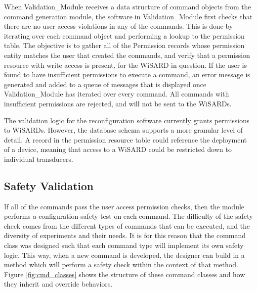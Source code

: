 When Validation\_Module receives a data structure of command objects from the command generation module, the software in Validation\_Module first checks that there are no user access violations in any of the commands. This is done by iterating over each command object and performing a lookup to the permission table. The objective is to gather all of the Permission records whose permission entity matches the user that created the commands, and verify that a permission resource with write access is present, for the WiSARD in question. If the user is found to have insufficient permissions to execute a command, an error message is generated and added to a queue of messages that is displayed once Validation\_Module has iterated over every command. All commands with insufficient permissions are rejected, and will not be sent to the WiSARDs.

The validation logic for the reconfiguration software currently grants permissions to WiSARDs. However, the database schema supports a more granular level of detail. A record in the permission resource table could reference the deployment of a device, meaning that access to a WiSARD could be restricted down to individual transducers. 

\subsection{Safety Validation}
 If all of the commands pass the user access permission checks, then the module performs a configuration safety test on each command. The difficulty of the safety check comes from the different types of commands that can be executed, and the diversity of experiments and their needs. It is for this reason that the command class was designed such that each command type will implement its own safety logic. This way, when a new command is developed, the designer can build in a method which will perform a safety check within the context of that method. Figure \ref{fig:cmd_classes} shows the structure of these command classes and how they inherit and override behaviors.
 
